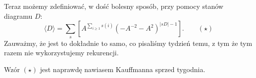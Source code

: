 \documentclass{article}
\begin{document}
Teraz możemy zdefiniować, w dość bolesny sposób,  przy pomocy stanów diagramu $D$:
$$\langle D\rangle = \sum_s\left[A^{\sum_{i\geq 1} s(i)}(-A^{-2}-A^2)^{|sD|-1}\right].\quad \quad (\star)$$
Zauważmy, że jest to dokładnie to samo, co pisaliśmy tydzień temu, z tym że tym razem nie wykorzystujemy rekurencji.

\begin{fuck}
  Wzór $(\star)$ jest naprawdę nawiasem Kauffmanna sprzed tygodnia.
\end{fuck}


\def\iksik{\tikz[baseline=.1ex]{
  \draw[thick] (0,0)--(1.5ex, 1.5ex);
  \fill[white] (0.75ex, 0.75ex) circle (2pt);
  \draw[thick] (0,1.5ex)--(1.5ex, 0);
  }
}

\def\lewoprawo{\tikz[baseline=.1ex]{
    \draw[thick] (0,0)..controls(.5ex, .25ex)and(.5ex, 1.25ex)..(0,1.5ex);
    \draw[thick] (1.5ex,0)..controls(1ex, .25ex)and(1ex, 1.25ex)..(1.5ex,1.5ex);
  }
}

\def\goradol{\tikz[baseline=.1ex]{
    \draw[thick] (0,0)..controls(.25ex, .5ex)and(1.25ex, .5ex)..(1.5ex,0);
    \draw[thick] (0,1.5ex)..controls(.25ex, 1ex)and(1.25ex, 1ex)..(1.5ex,1.5ex);
  }
}
\end{document}
